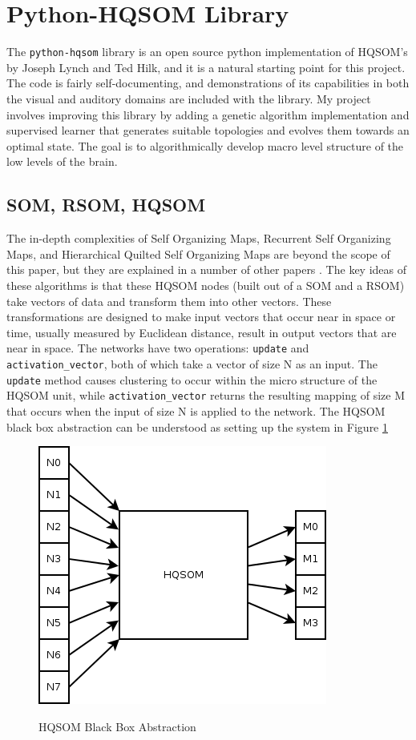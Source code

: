 \documentclass[12pt,a4paper]{article}
\begin{document}
\section{Python-HQSOM Library}
The \texttt{python-hqsom} library is an open source python implementation of HQSOM's by Joseph Lynch and Ted Hilk, and it is a natural starting point for this project.  The code is fairly self-documenting, and demonstrations of its capabilities in both the visual and auditory domains are included with the library.  My project involves improving this library by adding a genetic algorithm implementation and supervised learner that generates suitable topologies and evolves them towards an optimal state.  The goal is to algorithmically develop macro level structure of the low levels of the brain.

\subsection{SOM, RSOM, HQSOM}
The in-depth complexities of Self Organizing Maps, Recurrent Self Organizing Maps, and Hierarchical Quilted Self Organizing Maps are beyond the scope of this paper, but they are explained in a number of other papers \cite{MLPaper} \cite{HQSOM}.  The key ideas of these algorithms is that these HQSOM nodes (built out of a SOM and a RSOM) take vectors of data and transform them into other vectors.  These transformations are designed to make input vectors that occur near in space or time, usually measured by Euclidean distance, result in output vectors that are near in space.  The networks have two operations: \texttt{update} and \texttt{activation\_vector}, both of which take a vector of size N as an input.  The \texttt{update} method causes clustering to occur within the micro structure of the HQSOM unit, while \texttt{activation\_vector} returns the resulting mapping of size M that occurs when the input of size N is applied to the network.  The HQSOM black box abstraction can be understood as setting up the system in Figure \ref{fig:HQSOM}

\begin{figure}[H]
\caption{HQSOM Black Box Abstraction}
\centering
\includegraphics[scale=.5]{hqsom_black_box.png}
\label{fig:HQSOM}
\end{figure}
\end{document}
